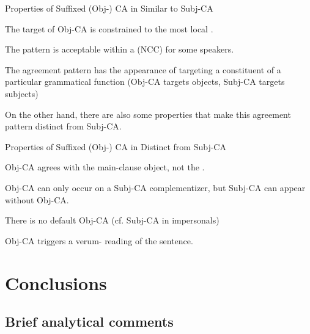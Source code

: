 \documentclass[output=paper
,newtxmath
,modfonts
,nonflat]{langsci/langscibook}
\begin{document}
\begin{exe}
\ex Properties of Suffixed (Obj-) CA in  Similar to Subj-CA
\begin{xlist}

\ex The target of Obj-CA is constrained to the most local . 


\ex The pattern is acceptable within a  (NCC) for some speakers.

\ex The agreement pattern has the appearance of targeting a constituent of a particular grammatical function (Obj-CA targets objects, Subj-CA targets subjects)

\end{xlist}
\end{exe}

\noindent On the other hand, there are also some properties that make this agreement pattern distinct from Subj-CA.

\begin{exe}
\ex Properties of Suffixed (Obj-) CA in  Distinct from Subj-CA
\begin{xlist}

\ex Obj-CA agrees with the main-clause object, not the . 

\ex Obj-CA can only occur on a Subj-CA complementizer, but Subj-CA can appear without Obj-CA. 

\ex There is no default Obj-CA (cf. Subj-CA in impersonals)

\ex Obj-CA triggers a verum- reading of the sentence. 

\end{xlist}
\end{exe}




\section{Conclusions} \label{Conclusions}

\subsection{Brief analytical comments}
\end{document}
